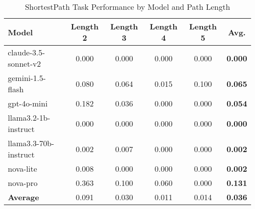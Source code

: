 \begin{table}[ht]
\centering
\caption{ShortestPath Task Performance by Model and Path Length}
\begin{tabular}{lccccc}
\toprule
Model & Length 2 & Length 3 & Length 4 & Length 5 & \textbf{Avg.} \\
\midrule
claude-3.5-sonnet-v2 & 0.000 & 0.000 & 0.000 & 0.000 & \textbf{0.000} \\
gemini-1.5-flash & 0.080 & 0.064 & 0.015 & 0.100 & \textbf{0.065} \\
gpt-4o-mini & 0.182 & 0.036 & 0.000 & 0.000 & \textbf{0.054} \\
llama3.2-1b-instruct & 0.000 & 0.000 & 0.000 & 0.000 & \textbf{0.000} \\
llama3.3-70b-instruct & 0.002 & 0.007 & 0.000 & 0.000 & \textbf{0.002} \\
nova-lite & 0.008 & 0.000 & 0.000 & 0.000 & \textbf{0.002} \\
nova-pro & 0.363 & 0.100 & 0.060 & 0.000 & \textbf{0.131} \\
\midrule
\textbf{Average} & 0.091 & 0.030 & 0.011 & 0.014 & \textbf{0.036} \\
\bottomrule
\end{tabular}
\end{table}